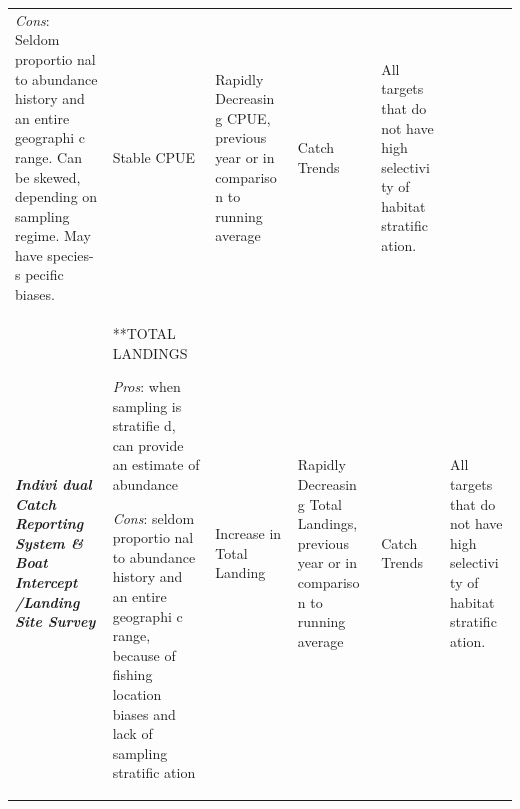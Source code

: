 \documentclass[]{book}
\begin{document}
\begin{longtable}[]{@{}llllll@{}}
\begin{minipage}[t]{0.16\columnwidth}
\emph{Cons}: Seldom proportio nal to abundance history and an entire
geographi c range. Can be skewed, depending on sampling regime. May have
species-s pecific biases.\strut
\end{minipage} & \begin{minipage}[t]{0.16\columnwidth}\raggedright\strut
Stable CPUE\strut
\end{minipage} & \begin{minipage}[t]{0.16\columnwidth}\raggedright\strut
Rapidly Decreasin g CPUE, previous year or in compariso n to running
average\strut
\end{minipage} & \begin{minipage}[t]{0.16\columnwidth}\raggedright\strut
Catch Trends\strut
\end{minipage} & \begin{minipage}[t]{0.16\columnwidth}\raggedright\strut
All targets that do not have high selectivi ty of habitat stratific
ation.\strut
\end{minipage}\tabularnewline
\begin{minipage}[t]{0.16\columnwidth}\raggedright\strut
\textbf{\emph{Indivi dual Catch Reporting System \& Boat Intercept
/Landing Site Survey}}\strut
\end{minipage} & \begin{minipage}[t]{0.16\columnwidth}\raggedright\strut
**TOTAL LANDINGS\emph{ }

\emph{Pros}: when sampling is stratifie d, can provide an estimate of
abundance

\emph{Cons}: seldom proportio nal to abundance history and an entire
geographi c range, because of fishing location biases and lack of
sampling stratific ation\strut
\end{minipage} & \begin{minipage}[t]{0.16\columnwidth}\raggedright\strut
Increase in Total Landing\strut
\end{minipage} & \begin{minipage}[t]{0.16\columnwidth}\raggedright\strut
Rapidly Decreasin g Total Landings, previous year or in compariso n to
running average\strut
\end{minipage} & \begin{minipage}[t]{0.16\columnwidth}\raggedright\strut
Catch Trends\strut
\end{minipage} & \begin{minipage}[t]{0.16\columnwidth}\raggedright\strut
All targets that do not have high selectivi ty of habitat stratific
ation.\strut
\end{minipage}\tabularnewline
\bottomrule
\end{longtable}
\end{document}

